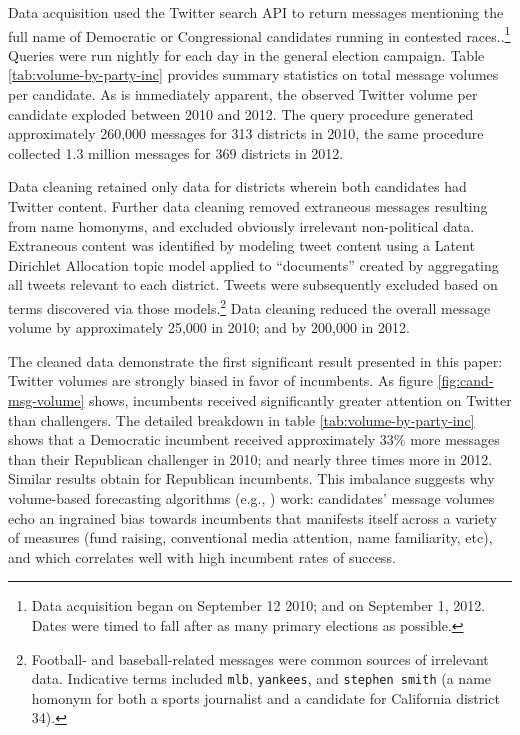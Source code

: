 \documentclass{acm_proc_article-sp}
\begin{document}
Data acquisition used the Twitter search API to return messages
mentioning the full name of Democratic or Congressional candidates
running in contested races..\footnote{Data acquisition began on September 12
2010; and on September 1, 2012. Dates were timed to fall after as many
primary elections as possible.} Queries were run nightly for each day
in the general election campaign. Table
\ref{tab:volume-by-party-inc} provides summary statistics on total
message volumes per candidate. As is immediately apparent, the observed
Twitter volume per candidate exploded between 2010 and 2012. The query
procedure generated approximately 260,000 messages for 313 districts
in 2010, the same procedure collected 1.3 million messages for 369
districts in 2012.  %

Data cleaning retained only
data for districts wherein both candidates had Twitter
content. Further data cleaning removed extraneous messages resulting
from name homonyms, and excluded obviously irrelevant non-political
data. Extraneous content was identified by modeling tweet content
using a Latent Dirichlet Allocation topic model applied to
``documents'' created by aggregating all tweets relevant to each
district. Tweets were subsequently excluded based on terms discovered
via those models.\footnote{Football- and baseball-related messages were
  common sources of irrelevant data. Indicative terms included
  \texttt{mlb}, \texttt{yankees}, and \texttt{stephen smith} (a name
  homonym for both a sports journalist and a candidate for California
  district 34).} Data cleaning reduced the overall message volume
by approximately 25,000 in 2010; and by 200,000 in 2012.

The cleaned data demonstrate the first significant result presented in
this paper: Twitter volumes are strongly biased in favor of
incumbents. As figure \ref{fig:cand-msg-volume} shows, incumbents
received significantly greater attention on Twitter than challengers.
The detailed breakdown in table \ref{tab:volume-by-party-inc} shows
that a Democratic incumbent received approximately 33\% more messages
than their Republican challenger in 2010; and nearly three times more
in 2012. Similar results obtain for Republican incumbents. This
imbalance suggests why volume-based forecasting algorithms (e.g.,
\cite{digrazia2013,tumasjan2010election,bermingham2011using}) work:
candidates' message volumes echo an ingrained bias towards incumbents
that manifests itself across a variety of measures (fund raising,
conventional media attention, name familiarity, etc), and which
correlates well with high incumbent rates of success. 
\end{document}
